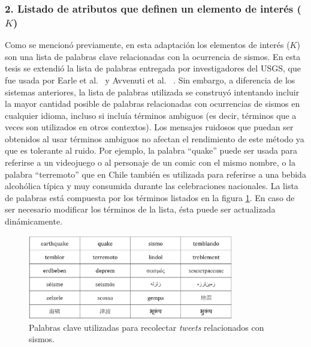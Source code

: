 	\subsubsection*{2. Listado de atributos que definen un elemento de interés ($K$)} 
	Como se mencionó previamente, en esta adaptación los elementos de interés ($K$) son una lista de palabras clave relacionadas con la ocurrencia de sismos.
	En esta tesis se extendió la lista de palabras entregada por investigadores del USGS, que fue usada por Earle et al.~\cite{earle2012twitter} y Avvenuti et al.~	\cite{avvenuti2014earthquake,avvenuti2014ears}.
	Sin embargo, a diferencia de los sistemas anteriores, la lista de palabras utilizada se construyó intentando incluir la mayor cantidad posible de palabras relacionadas con ocurrencias de sismos en cualquier idioma, incluso si incluía términos ambiguos (es decir, términos que a veces son utilizados en otros contextos).
	Los mensajes ruidosos que puedan ser obtenidos al usar términos ambiguos no afectan el rendimiento de este método ya que es tolerante al ruido. 
	Por ejemplo, la palabra ``quake'' puede ser usada para referirse a un videojuego o al personaje de un comic con el mismo nombre, o la palabra ``terremoto'' que en Chile también es utilizada para referirse a una bebida alcohólica típica y muy consumida durante las celebraciones nacionales. 
	La lista de palabras está compuesta por los términos listados en la figura \ref{img:keywords}. 
	En caso de ser necesario modificar los términos de la lista, ésta puede ser actualizada dinámicamente.
	
	\begin{figure}[h!]
	\centering
	\includegraphics[width=0.8\textwidth]{imagenes/Keywords.pdf}
	\caption{Palabras clave utilizadas para recolectar \textit{tweets} relacionados con sismos.}
	\label{img:keywords}
	\end{figure}
	
